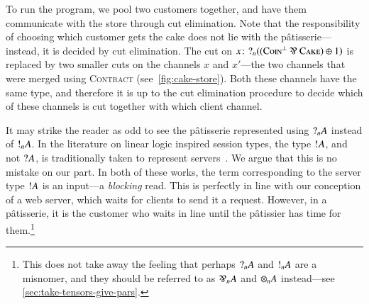 \documentclass[twocolumn]{article}
\begin{document}
To run the program, we pool two customers together, and have them communicate
with the store through cut elimination. Note that the responsibility of choosing
which customer gets the cake does not lie with the p\^{a}tisserie---instead, it
is decided by cut elimination. The cut on
$\tm[x]{\give[n]((\coin^\bot\parr\cake)\plus{1})}$ is replaced by two smaller
cuts on the channels $x$ and $x'$---the two channels that were merged using
\textsc{Contract} (see~\autoref{fig:cake-store}). Both these channels have the same
type, and therefore it is up to the cut elimination procedure to decide which of
these channels is cut together with which client channel.

It may strike the reader as odd to see the p\^{a}tisserie represented using
$\give[n]{A}$ instead of $\take[n]{A}$.
In the literature on linear logic inspired session types, the type $\take{A}$,
and not $\give{A}$, is traditionally taken to represent
servers~\citep{caires2010,wadler2012}.
We argue that this is no mistake on our part.
In both of these works, the term corresponding to the server type $\take{A}$ is
an input---a \emph{blocking} read.
This is perfectly in line with our conception of a web server, which waits for
clients to send it a request.
However, in a p\^{a}tisserie, it is the customer who waits in line until the
p\^{a}tissier has time for them.\footnote{
  This does not take away the feeling that perhaps $\give[n]{A}$ and
  $\take[n]{A}$ are a misnomer, and they should be referred to as
  ${\parr}_{n}{A}$ and ${\mult}_{n}{A}$ instead---see
  \autoref{sec:take-tensors-give-pars}. 
}
\end{document}
